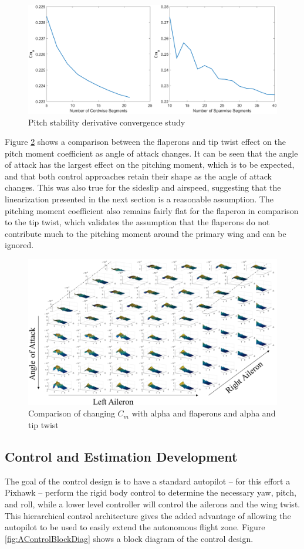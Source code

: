 \documentclass[11pt]{ucthesis}
\begin{document}
\begin{figure}[thpb]
\centering
\includegraphics[width=.7\linewidth]{Figures/SegmentConverge.png}
\caption{Pitch stability derivative convergence study}
\label{fig:Aconverge}
\end{figure}

Figure \ref{fig:ADataCube} shows a comparison between the flaperons and tip twist effect on the pitch moment coefficient as angle of attack changes. It can be seen that the angle of attack has the largest effect on the pitching moment, which is to be expected, and that both control approaches retain their shape as the angle of attack changes. This was also true for the sideslip and airspeed, suggesting that the linearization presented in the next section is a reasonable assumption. The pitching moment coefficient also remains fairly flat for the flaperon in comparison to the tip twist, which validates the assumption that the flaperons do not contribute much to the pitching moment around the primary wing and can be ignored.

\begin{figure}[thpb]
\centering
\includegraphics[width=1\linewidth]{Figures/DataCube.png}
\caption{Comparison of changing $C_m$ with alpha and flaperons and alpha and tip twist}
\label{fig:ADataCube}
\end{figure}

\subsection{Control and Estimation Development}
The goal of the control design is to have a standard autopilot – for this effort a Pixhawk – perform the rigid body control to determine the necessary yaw, pitch, and roll, while a lower level controller will control the ailerons and the wing twist. This hierarchical control architecture gives the added advantage of allowing the autopilot to be used to easily extend the autonomous flight zone. Figure \ref{fig:AControlBlockDiag} shows a block diagram of the control design.
\end{document}

